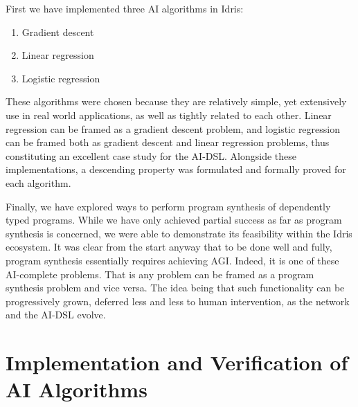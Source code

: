 \documentclass[]{report}
\begin{document}
First we have implemented three AI algorithms in Idris:
\begin{enumerate}
\item Gradient descent
\item Linear regression
\item Logistic regression
\end{enumerate}
These algorithms were chosen because they are relatively simple, yet
extensively use in real world applications, as well as tightly related
to each other.  Linear regression can be framed as a gradient descent
problem, and logistic regression can be framed both as gradient
descent and linear regression problems, thus constituting an excellent
case study for the AI-DSL.  Alongside these implementations, a
descending property was formulated and formally proved for each
algorithm.

Finally, we have explored ways to perform program synthesis of
dependently typed programs.  While we have only achieved partial
success as far as program synthesis is concerned, we were able to
demonstrate its feasibility within the Idris ecosystem.  It was clear
from the start anyway that to be done well and fully, program
synthesis essentially requires achieving AGI.  Indeed, it is one of
these AI-complete problems.  That is any problem can be framed as a
program synthesis problem and vice versa.  The idea being that such
functionality can be progressively grown, deferred less and less to
human intervention, as the network and the AI-DSL evolve.

\chapter{Implementation and Verification of AI Algorithms}
\end{document}
